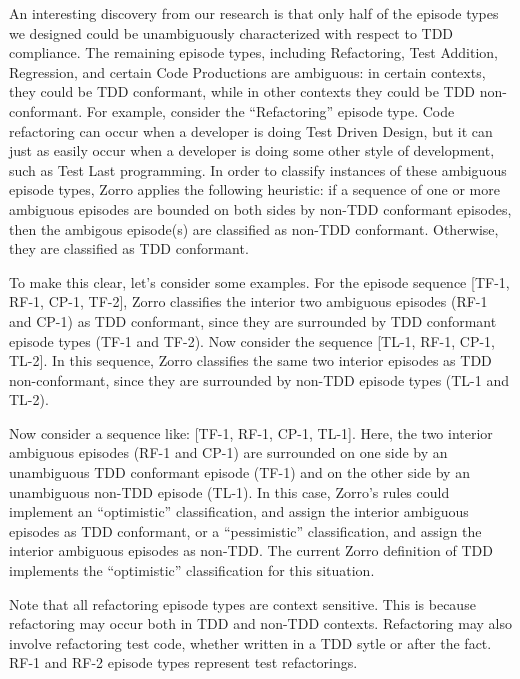 \documentclass[smallextended]{svjour3}     %
\begin{document}
An interesting discovery from our research is that only half of the episode
types we designed could be unambiguously characterized with respect to TDD
compliance.  The remaining episode types, including Refactoring, Test
Addition, Regression, and certain Code Productions are ambiguous: in
certain contexts, they could be TDD conformant, while in other contexts
they could be TDD non-conformant.  For example, consider the ``Refactoring'' episode
type.  Code refactoring can occur when a developer is doing Test Driven
Design, but it can just as easily occur when a developer is doing some
other style of development, such as Test Last programming.  In order to
classify instances of these ambiguous episode types, Zorro applies the
following heuristic: if a sequence of one or more ambiguous episodes are
bounded on both sides by non-TDD conformant episodes, then the ambigous
episode(s) are classified as non-TDD conformant. Otherwise, they are
classified as TDD conformant.

To make this clear, let's consider some examples.  For the episode sequence
[TF-1, RF-1, CP-1, TF-2], Zorro classifies the interior two ambiguous episodes (RF-1 and
CP-1) as TDD conformant, since they are surrounded by TDD conformant
episode types (TF-1 and TF-2).  Now consider the sequence [TL-1, RF-1,
CP-1, TL-2].  In this sequence, Zorro classifies the same two interior 
episodes as TDD non-conformant, since they are surrounded
by non-TDD episode types (TL-1 and TL-2).

Now consider a sequence like: [TF-1, RF-1, CP-1, TL-1].  Here, the two
interior ambiguous episodes (RF-1 and CP-1) are surrounded on one side by an
unambiguous TDD conformant episode (TF-1) and on the other side by an
unambiguous non-TDD episode (TL-1).  In this case, Zorro's rules
could implement an ``optimistic'' classification, and assign the interior ambiguous
episodes as TDD conformant, or a ``pessimistic'' classification, and assign
the interior ambiguous episodes as non-TDD.  The current Zorro definition
of TDD implements the ``optimistic'' classification for this situation.

Note that all refactoring episode types are context sensitive. This is because refactoring may occur 
both in TDD and non-TDD contexts. Refactoring may also involve refactoring test code, whether written in a TDD sytle or after the fact. RF-1 and RF-2 episode types represent test refactorings. 
\end{document}
